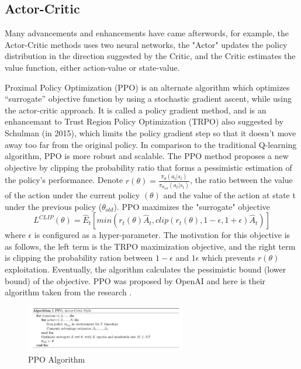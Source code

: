 \documentclass[leqno]{article}
\begin{document}
\begin{multicols}{2}
\subsection{Actor-Critic}
Many advancements and enhancements have came afterwords, for example, the Actor-Critic methods uses two neural networks, the "Actor" updates the policy distribution in the direction suggested by the Critic, and the Critic estimates the value function, either action-value or state-value.


Proximal Policy Optimization (PPO) is an alternate algorithm which optimizes “surrogate” objective function by using a stochastic gradient ascent, while using the actor-critic approach. It is called a policy gradient method, and is an enhancemant to Trust Region Policy Optimization (TRPO) also suggested by Schulman (in 2015), which limits the policy gradient step so that it doesn't move away too far from the original policy. In comparison to the traditional Q-learning algorithm, PPO is more robust and scalable. The PPO method proposes a new objective by clipping the probability ratio that forms a pessimistic estimation of the policy’s performance. Denote $r(\theta)=\frac{\pi_{\theta}(a_{t}|s_{t})}{\pi_{\theta_{old}}(a_{t}|s_{t})}$, the ratio between the value of the action under the current policy $(\theta)$ and the value of the action at state t under the previous policy ($\theta_{old}$). PPO maximizes the "surrogate" objective
\begin{equation*}
L^{CLIP}(\theta) = \hat{E}_{t}[min(r_{t}(\theta)\hat{A}_{t},clip(r_{t}(\theta), 1-\epsilon, 1+\epsilon)\hat{A}_{t})]    
\end{equation*}
where $\epsilon$ is configured as a hyper-parameter. The motivation for this objective is as follows, the left term is the TRPO maximization objective, and the right term is clipping the probability ration between $1-\epsilon$ and $1\epsilon$ which prevents $r(\theta)$ exploitation. Eventually, the algorithm calculates the pessimistic bound (lower bound) of the objective.
PPO was proposed by OpenAI and here is their algorithm taken from the research \cite{ppo}.

\begin{figure}[H]
\centering
    \centering\includegraphics[width=7cm]{figs/PPO_algorithm.jpeg}
    \caption{PPO Algorithm}
  \label{ppo_algo}
\end{figure}


\end{multicols}
\end{document}
